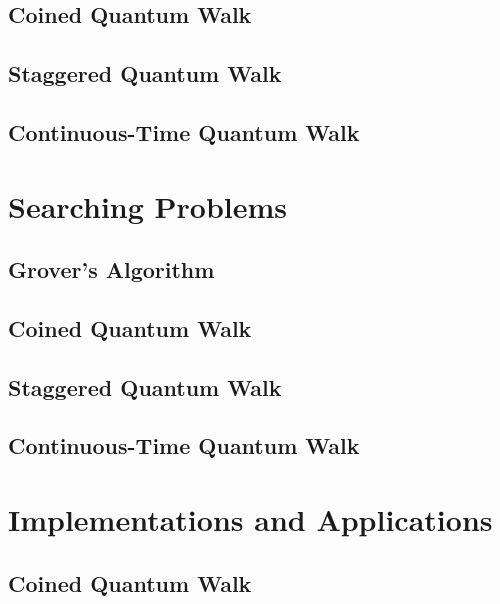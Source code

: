 \documentclass[
oneside,
11pt, a4paper,
footinclude=true,
headinclude=true,
cleardoublepage=empty
]{scrbook}
\begin{document}
\section{Coined Quantum Walk}\label{sec:chap3Coinedwalk}

\section{Staggered Quantum Walk}\label{sec:chap3StagWalk}

\section{Continuous-Time Quantum Walk}\label{sec:chap3Contwalk}



\chapter{Searching Problems}\label{chap:searchingProblems}

\section{Grover's Algorithm}\label{sec:GrovSearchSimul}

\section{Coined Quantum Walk}\label{sec:CoinedSearchSimul}

\section{Staggered Quantum Walk}\label{sec:StagSearchSimul}

\section{Continuous-Time Quantum Walk}\label{sec:ContSearchSimul}



\chapter{Implementations and Applications}\label{chap:qiskitImplementation}

\section{Coined Quantum Walk}\label{sec:CoinedQiskit}

\end{document}
